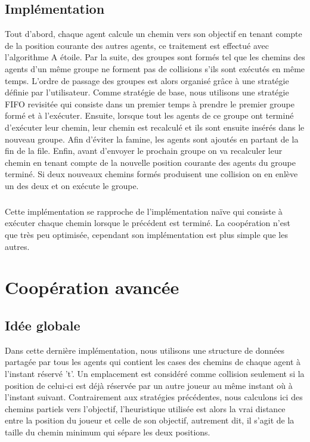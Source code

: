 \documentclass[a4paper, twocolumn]{article}
\begin{document}
			\subsection{Implémentation}
			Tout d'abord, chaque agent calcule un chemin vers son objectif en tenant compte de la position courante des autres agents, ce traitement est effectué avec l'algorithme A étoile. Par la suite, des groupes sont formés tel que les chemins des agents d'un même groupe ne forment pas de collisions s'ils sont exécutés en même temps. 
			L'ordre de passage des groupes est alors organisé grâce à une stratégie définie par l'utilisateur. Comme stratégie de base, nous utilisons une stratégie FIFO revisitée qui consiste dans un premier temps à prendre le premier groupe formé et à l'exécuter. Ensuite, lorsque tout les agents de ce groupe ont terminé d'exécuter leur chemin, leur chemin est recalculé et ils sont ensuite insérés dans le nouveau groupe. Afin d'éviter la famine, les agents sont ajoutés en partant de la fin de la file.
			Enfin, avant d'envoyer le prochain groupe on va recalculer leur chemin en tenant compte de la nouvelle position courante des agents du groupe terminé. Si deux nouveaux chemins formés produisent une collision on en enlève un des deux et on exécute le groupe.

			\subparagraph{}
			Cette implémentation se rapproche de l'implémentation naïve qui consiste à exécuter chaque chemin lorsque le précédent est terminé. La coopération n'est que très peu optimisée, cependant son implémentation est plus simple que les autres.

		\section{Coopération avancée}

			\subsection{Idée globale}
			Dans cette dernière implémentation, nous utilisons une structure de données partagée par tous les agents qui contient les cases des chemins de chaque agent à l'instant réservé 't'. Un emplacement est considéré comme collision seulement si la position de celui-ci est déjà réservée par un autre joueur au même instant où à l'instant suivant. 
			Contrairement aux stratégies précédentes, nous calculons ici des chemins partiels vers l'objectif, l'heuristique utilisée est alors la vrai distance entre la position du joueur et celle de son objectif, autrement dit, il s'agit de la taille du chemin minimum qui sépare les deux positions. 
\end{document}
